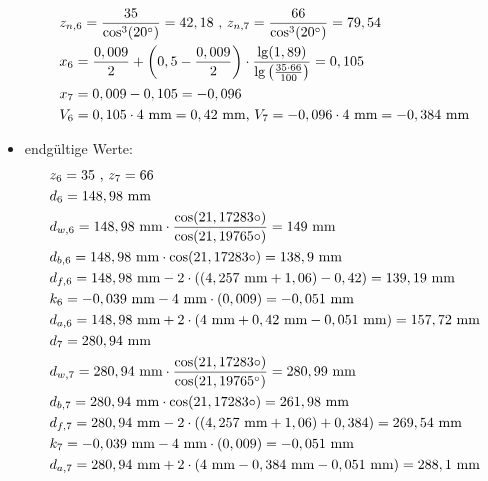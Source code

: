 \begin{itemize}
\begin{align*}
	&z_{n,6} = \frac{35}{\cos^3(20^\circ)} = 42,18 \text{ , }z_{n,7} = \frac{66}{\cos^3(20^\circ)} = 79,54 \\
	&x_6 =\frac{0,009}{2} + \left( 0,5 - \frac{0,009}{2} \right) \cdot \frac{\lg(1,89)}{\lg\left( \frac{35 \cdot 66}{100} \right)} = 0,105 \\
	&x_7 = 0,009 - 0,105 = - 0,096 \\ 
	&V_6 = 0,105 \cdot 4 \text{ mm} = 0,42 \text{ mm, }V_7 = -0,096\cdot 4 \text{ mm} = -0,384 \text{ mm} 
	\end{align*}
\item endgültige Werte:
\begin{align*}
	&z_6 = 35 \text{ , } z_7 = 66 \\
	&d_6 = 148,98 \text{ mm} \\
	&d_{w,6} = 148,98  \text{ mm}\cdot \frac{\cos(21,17283\circ)}{\cos(21,19765\circ)} = 149 \text{ mm}\\
	&d_{b,6} = 148,98  \text{ mm} \cdot \cos(21,17283\circ) = 138,9  \text{ mm}\\
	&d_{f,6} = 148,98  \text{ mm} -2 \cdot ((4,257 \text{ mm}+1,06)-0,42) = 139,19 \text{ mm}\\
	&k_6 = -0,039 \text{ mm} -4 \text{ mm} \cdot (0,009) =- 0,051 \text{ mm}\\
	&d_{a,6} = 148,98  \text{ mm} +2 \cdot (4\text{ mm}+0,42 \text{ mm} -0,051 \text{ mm}) = 157,72\text{ mm}\\
	&d_7 =280,94 \text{ mm} \\
	&d_{w,7} =280,94  \text{ mm}\cdot \frac{\cos(21,17283\circ)}{\cos(21,19765^\circ)} = 280,99  \text{ mm}\\
	&d_{b,7} = 280,94  \text{ mm} \cdot \cos(21,17283\circ) = 261,98 \text{ mm}\\
	&d_{f,7} = 280,94  \text{ mm} -2 \cdot ((4,257 \text{ mm}+1,06)+0,384) = 269,54 \text{ mm}\\
	&k_7 = -0,039 \text{ mm} -4 \text{ mm} \cdot (0,009) =- 0,051 \text{ mm}\\
	&d_{a,7} = 280,94  \text{ mm} +2 \cdot (4\text{ mm}-0,384 \text{ mm} -0,051 \text{ mm}) = 288,1\text{ mm}
\end{align*}	
\end{itemize}
\newpage
